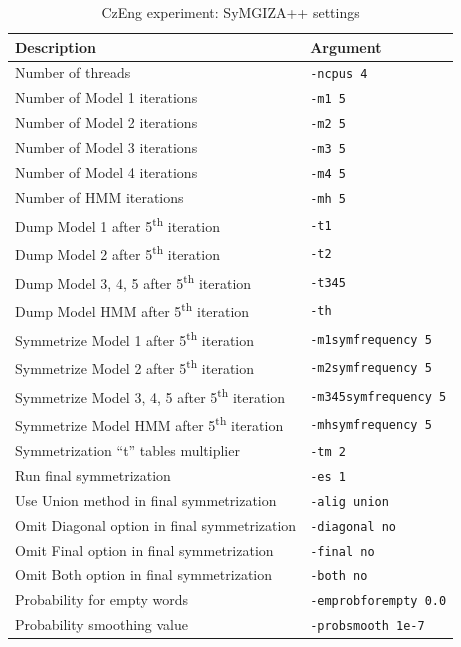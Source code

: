 \begin{table}[!htb]
	\centering
	\caption{CzEng experiment: SyMGIZA++ settings}
	\label{table:czeng_symgiza_settings}
	\vspace{1em}
	\begin{tabular}{|l|l|}
		\hline
		\textbf{Description} & \textbf{Argument} \\
		\hline
		Number of threads & \texttt{-ncpus 4} \\
		Number of Model 1 iterations & \texttt{-m1 5} \\
		Number of Model 2 iterations & \texttt{-m2 5} \\
		Number of Model 3 iterations & \texttt{-m3 5} \\
		Number of Model 4 iterations & \texttt{-m4 5} \\
		Number of HMM iterations & \texttt{-mh 5} \\
		Dump Model 1 after 5\textsuperscript{th} iteration & \texttt{-t1} \\
		Dump Model 2 after 5\textsuperscript{th} iteration & \texttt{-t2} \\
		Dump Model 3, 4, 5 after 5\textsuperscript{th} iteration & \texttt{-t345} \\
		Dump Model HMM after 5\textsuperscript{th} iteration & \texttt{-th} \\
		Symmetrize Model 1 after 5\textsuperscript{th} iteration & \texttt{-m1symfrequency 5} \\
		Symmetrize Model 2 after 5\textsuperscript{th} iteration & \texttt{-m2symfrequency 5} \\
		Symmetrize Model 3, 4, 5 after 5\textsuperscript{th} iteration & \texttt{-m345symfrequency 5} \\
		Symmetrize Model HMM after 5\textsuperscript{th} iteration & \texttt{-mhsymfrequency 5} \\
		Symmetrization ``t'' tables multiplier & \texttt{-tm 2} \\
		Run final symmetrization & \texttt{-es 1} \\
		Use Union method in final symmetrization & \texttt{-alig union} \\
		Omit Diagonal option in final symmetrization & \texttt{-diagonal no} \\
		Omit Final option in final symmetrization & \texttt{-final no} \\
		Omit Both option in final symmetrization & \texttt{-both no} \\
		Probability for empty words & \texttt{-emprobforempty 0.0} \\
		Probability smoothing value & \texttt{-probsmooth 1e-7} \\
		\hline
	\end{tabular}
\end{table}

